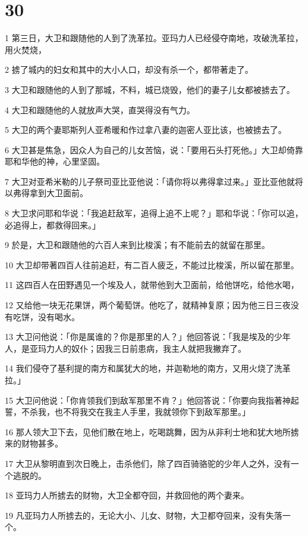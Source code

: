 \chapter{30}

\par 1 第三日，大卫和跟随他的人到了洗革拉。亚玛力人已经侵夺南地，攻破洗革拉，用火焚烧，
\par 2 掳了城内的妇女和其中的大小人口，却没有杀一个，都带著走了。
\par 3 大卫和跟随他的人到了那城，不料，城已烧毁，他们的妻子儿女都被掳去了。
\par 4 大卫和跟随他的人就放声大哭，直哭得没有气力。
\par 5 大卫的两个妻耶斯列人亚希暖和作过拿八妻的迦密人亚比该，也被掳去了。
\par 6 大卫甚是焦急，因众人为自己的儿女苦恼，说：「要用石头打死他。」大卫却倚靠耶和华他的神，心里坚固。
\par 7 大卫对亚希米勒的儿子祭司亚比亚他说：「请你将以弗得拿过来。」亚比亚他就将以弗得拿到大卫面前。
\par 8 大卫求问耶和华说：「我追赶敌军，追得上追不上呢？」耶和华说：「你可以追，必追得上，都救得回来。」
\par 9 於是，大卫和跟随他的六百人来到比梭溪；有不能前去的就留在那里。
\par 10 大卫却带著四百人往前追赶，有二百人疲乏，不能过比梭溪，所以留在那里。
\par 11 这四百人在田野遇见一个埃及人，就带他到大卫面前，给他饼吃，给他水喝，
\par 12 又给他一块无花果饼，两个葡萄饼。他吃了，就精神复原；因为他三日三夜没有吃饼，没有喝水。
\par 13 大卫问他说：「你是属谁的？你是那里的人？」他回答说：「我是埃及的少年人，是亚玛力人的奴仆；因我三日前患病，我主人就把我撇弃了。
\par 14 我们侵夺了基利提的南方和属犹大的地，并迦勒地的南方，又用火烧了洗革拉。」
\par 15 大卫问他说：「你肯领我们到敌军那里不肯？」他回答说：「你要向我指著神起誓，不杀我，也不将我交在我主人手里，我就领你下到敌军那里。」
\par 16 那人领大卫下去，见他们散在地上，吃喝跳舞，因为从非利士地和犹大地所掳来的财物甚多。
\par 17 大卫从黎明直到次日晚上，击杀他们，除了四百骑骆驼的少年人之外，没有一个逃脱的。
\par 18 亚玛力人所掳去的财物，大卫全都夺回，并救回他的两个妻来。
\par 19 凡亚玛力人所掳去的，无论大小、儿女、财物，大卫都夺回来，没有失落一个。
